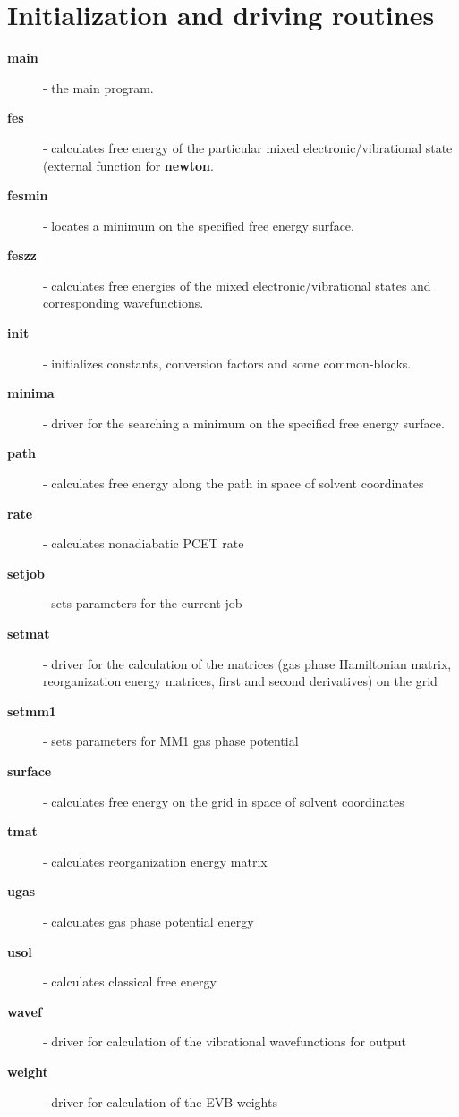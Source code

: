 \documentclass[oneside,11pt,openany]{book}
\newcommand{\tw}{\ttfamily}
\begin{document}
\section{Initialization and driving routines}
\begin{description}
\item[{\tw\bf main}] - the main program.
\item[{\tw\bf fes}] - calculates free energy of the particular mixed
                   electronic/vibrational state (external
                   function for {\tw\bf newton}.
\item[{\tw\bf fesmin}] - locates a minimum on
                      the specified free energy surface.
\item[{\tw\bf feszz}] - calculates free energies of the mixed
                   electronic/vibrational states and corresponding
                   wavefunctions.
\item[{\tw\bf init}] - initializes constants, conversion factors
                    and some common-blocks.
\item[{\tw\bf minima}] - driver for the searching a minimum on
                      the specified free energy surface.
\item[{\tw\bf path}] - calculates free energy along the path
                    in space of solvent coordinates
\item[{\tw\bf rate}] - calculates nonadiabatic PCET rate
\item[{\tw\bf setjob}] - sets parameters for the current job
\item[{\tw\bf setmat}] - driver for the calculation of the matrices
                     (gas phase Hamiltonian matrix, reorganization
                      energy matrices, first and second derivatives)
                      on the grid
\item[{\tw\bf setmm1}] - sets parameters for MM1 gas phase potential
\item[{\tw\bf surface}] - calculates free energy on the grid
                       in space of solvent coordinates
\item[{\tw\bf tmat}] - calculates reorganization energy matrix
\item[{\tw\bf ugas}] - calculates gas phase potential energy
\item[{\tw\bf usol}] - calculates classical free energy
\item[{\tw\bf wavef}] - driver for calculation of the vibrational
                     wavefunctions for output
\item[{\tw\bf weight}] - driver for calculation of the EVB weights
\end{description}
\end{document}
